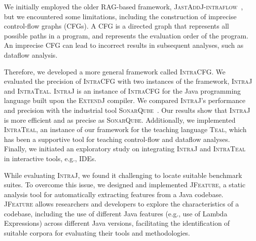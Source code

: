 
We initially employed the older RAG-based framework, \textsc{JastAddJ-intraflow}~\cite{10.1016/j.scico.2012.02.002},
but we encountered some limitations, including the construction of imprecise control-flow graphs (CFGs).
A CFG is a directed graph that represents all possible paths in a program, and
represents the evaluation order of the program. An imprecise CFG can lead to
incorrect results in subsequent analyses, such as dataflow analysis.

Therefore, we developed a more general framework called \textsc{IntraCFG}.
We evaluated the precision of \textsc{IntraCFG} with two instances of the framework,
\textsc{IntraJ} and \textsc{IntraTeal}.
\textsc{IntraJ} is an instance of \textsc{IntraCFG} for the Java programming language
built upon the \textsc{ExtendJ} compiler. We compared \textsc{IntraJ}'s performance and precision with the industrial tool \textsc{SonarQube}~\cite{sonarqube}. Our results
show that \textsc{IntraJ} is more efficient and as precise as \textsc{SonarQube}.
Additionally, we implemented \textsc{IntraTeal}, an instance of our framework for the teaching
language \textsc{Teal}, which has been a supportive tool for teaching control-flow and
dataflow analyses. Finally, we initiated an exploratory study on integrating
\textsc{IntraJ} and \textsc{IntraTeal} in interactive tools, e.g., IDEs.

While evaluating \textsc{IntraJ}, we found it challenging to locate suitable
benchmark suites. To overcome this issue, we designed and implemented \textsc{JFeature},
a static analysis tool for automatically extracting features from a Java codebase.
\textsc{JFeature} allows researchers and developers to explore the characteristics of a
codebase, including the use of different Java features (e.g., use of Lambda Expressions)  across different
Java versions, facilitating the identification of suitable corpora for evaluating
their tools and methodologies.

